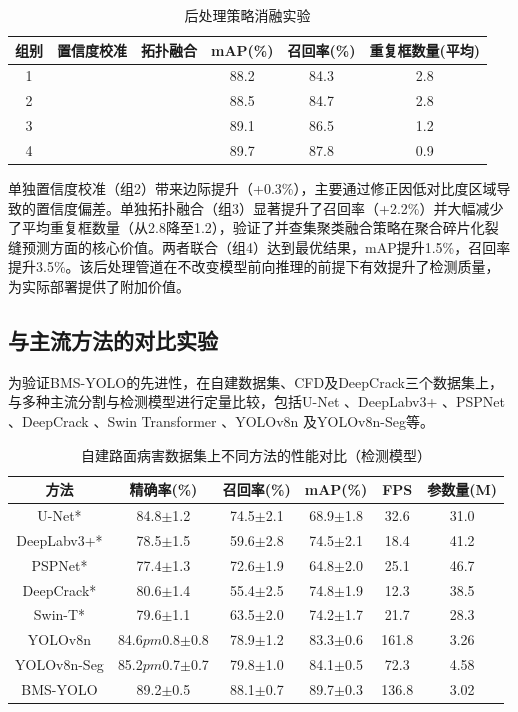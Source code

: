 \documentclass[twocolumn]{sn-jnl}
\begin{document}
	\begin{table}[htbp]
		\centering
		\caption{后处理策略消融实验}
		\begin{tabular}{cccccc}
			\toprule
			组别 & 置信度校准 & 拓扑融合 & mAP(\%) & 召回率(\%) & 重复框数量(平均) \\
			\midrule
			1 & & & 88.2 & 84.3 & 2.8 \\
			2 & \checkmark & & 88.5 & 84.7 & 2.8 \\
			3 & & \checkmark & 89.1 & 86.5 & 1.2 \\
			4 & \checkmark & \checkmark & 89.7 & 87.8 & 0.9 \\
			\bottomrule
		\end{tabular}
		\label{tab:post}
	\end{table}
	
	单独置信度校准（组2）带来边际提升（+0.3\%），主要通过修正因低对比度区域导致的置信度偏差。单独拓扑融合（组3）显著提升了召回率（+2.2\%）并大幅减少了平均重复框数量（从2.8降至1.2），验证了并查集聚类融合策略在聚合碎片化裂缝预测方面的核心价值。两者联合（组4）达到最优结果，mAP提升1.5\%，召回率提升3.5\%。该后处理管道在不改变模型前向推理的前提下有效提升了检测质量，为实际部署提供了附加价值。
	
	\subsection{与主流方法的对比实验}
	为验证BMS-YOLO的先进性，在自建数据集、CFD及DeepCrack三个数据集上，与多种主流分割与检测模型进行定量比较，包括U-Net \cite{Ronneberger2015}、DeepLabv3+ \cite{Chen2017}、PSPNet \cite{Zhao2017}、DeepCrack \cite{Zou2018}、Swin Transformer \cite{Liu2021}、YOLOv8n \cite{Jocher2023} 及YOLOv8n-Seg等。
	
	\begin{table}[htbp]
		\centering
		\caption{自建路面病害数据集上不同方法的性能对比（检测模型）}
		\begin{tabular}{cccccc}
			\toprule
			方法 & 精确率(\%) & 召回率(\%) & mAP(\%) & FPS & 参数量(M) \\
			\midrule
			U-Net* & 84.8$\pm$1.2 & 74.5$\pm$2.1 & 68.9$\pm$1.8 & 32.6 & 31.0 \\
			DeepLabv3+* & 78.5$\pm$1.5 & 59.6$\pm$2.8 & 74.5$\pm$2.1 & 18.4 & 41.2 \\
			PSPNet* & 77.4$\pm$1.3 & 72.6$\pm$1.9 & 64.8$\pm$2.0 & 25.1 & 46.7 \\
			DeepCrack* & 80.6$\pm$1.4 & 55.4$\pm$2.5 & 74.8$\pm$1.9 & 12.3 & 38.5 \\
			Swin-T* & 79.6$\pm$1.1 & 63.5$\pm$2.0 & 74.2$\pm$1.7 & 21.7 & 28.3 \\
			YOLOv8n & 84.6$pm$0.8$\pm$0.8 & 78.9$\pm$1.2 & 83.3$\pm$0.6 & 161.8 & 3.26 \\
			YOLOv8n-Seg & 85.2$pm$0.7$\pm$0.7 & 79.8$\pm$1.0 & 84.1$\pm$0.5 & 72.3 & 4.58 \\
			BMS-YOLO & 89.2$\pm$0.5 & 88.1$\pm$0.7 & 89.7$\pm$0.3 & 136.8 & 3.02 \\
			\bottomrule
		\end{tabular}
		\label{tab:compare_self}
	\end{table}
	
\end{document}
